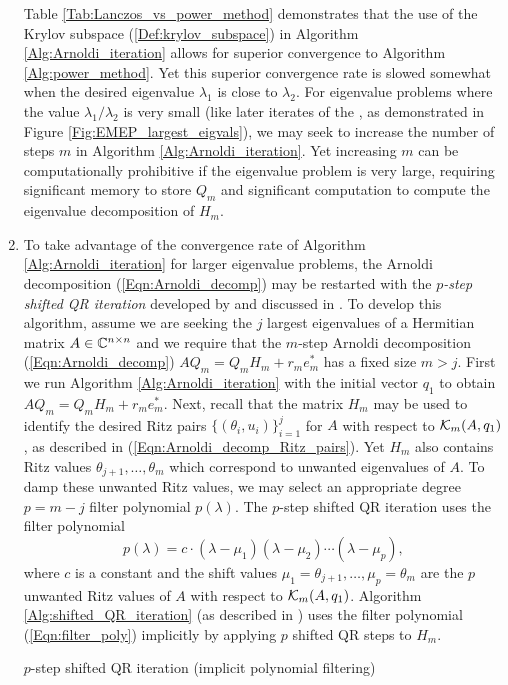 \begin{enumerate}
Table \ref{Tab:Lanczos_vs_power_method} demonstrates that the use of the Krylov subspace (\ref{Def:krylov_subspace}) in Algorithm \ref{Alg:Arnoldi_iteration} allows for superior convergence to Algorithm \ref{Alg:power_method}.  Yet this superior convergence rate is slowed somewhat when the desired eigenvalue $\lambda_1$ is close to $\lambda_2$.  For eigenvalue problems where the value $\lambda_1 / \lambda_2$ is very small (like later iterates of the \emep, as demonstrated in Figure \ref{Fig:EMEP_largest_eigvals}), we may seek to increase the number of steps $m$ in Algorithm \ref{Alg:Arnoldi_iteration}.  Yet increasing $m$ can be computationally prohibitive if the eigenvalue problem is very large, requiring significant memory to store $Q_m$ and significant computation to compute the eigenvalue decomposition of $H_m$.




\item

To take advantage of the convergence rate of Algorithm \ref{Alg:Arnoldi_iteration} for larger eigenvalue problems, the Arnoldi decomposition (\ref{Eqn:Arnoldi_decomp}) may be restarted with the \textit{$p$-step shifted QR iteration} developed by \cite{sorensen1992implicit} and discussed in \cite[Sections 10.5.2-3]{golub2012matrix}.  To develop this algorithm, assume we are seeking the $j$ largest eigenvalues of a Hermitian matrix $A \in {\mathbb C}^{n \times n}$ and we require that the $m$-step Arnoldi decomposition (\ref{Eqn:Arnoldi_decomp}) $AQ_m = Q_m H_m + r_m e_m^*$ has a fixed size $m > j$.  First we run Algorithm \ref{Alg:Arnoldi_iteration} with the initial vector $q_1$ to obtain $AQ_m = Q_m H_m + r_m e_m^*$.  Next, recall that the matrix $H_m$ may be used to identify the desired Ritz pairs $\{(\theta_i, u_i)\}_{i=1}^j$ for $A$ with respect to ${\mathcal K}_m(A, q_1)$, as described in (\ref{Eqn:Arnoldi_decomp_Ritz_pairs}).  Yet $H_m$ also contains Ritz values $\theta_{j+1}, \ldots, \theta_m$ which correspond to unwanted eigenvalues of $A$.  To damp these unwanted Ritz values, we may select an appropriate degree $p = m-j$ filter polynomial $p(\lambda)$.  The $p$-step shifted QR iteration uses the filter polynomial
\begin{equation} 			\label{Eqn:filter_poly}
p(\lambda) = c \cdot (\lambda - \mu_1) (\lambda - \mu_2) \cdots (\lambda - \mu_p),
\end{equation}
where $c$ is a constant and the shift values $\mu_1 = \theta_{j+1}, \ldots, \mu_p = \theta_m$ are the $p$ unwanted Ritz values of $A$ with respect to ${\mathcal K}_m(A, q_1)$.  Algorithm \ref{Alg:shifted_QR_iteration} (as described in \cite[Section 10.5.3]{golub2012matrix}) uses the filter polynomial (\ref{Eqn:filter_poly}) implicitly by applying $p$ shifted QR steps to $H_m$.
\begin{algorithm}[H]
\caption{$p$-step shifted QR iteration (implicit polynomial filtering)}	\label{Alg:shifted_QR_iteration}


\end{algorithm}
\end{enumerate}
